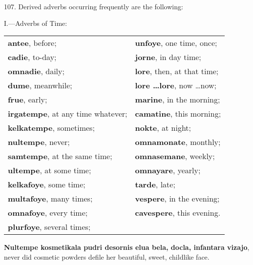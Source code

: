 107. Derived adverbs occurring frequently are the following:

\begin{center}I.—Adverbs of Time:\end{center}
\begin{tabular}{l l}
\textbf{antee}, before; & \textbf{unfoye}, one time, once; \\
\textbf{cadie}, to-day; & \textbf{jorne}, in day time; \\
\textbf{omnadie}, daily; & \textbf{lore}, then, at that time; \\
\textbf{dume}, meanwhile; & \textbf{lore \ldots  lore}, now \ldots now; \\
\textbf{frue}, early; & \textbf{marine}, in the morning; \\
\textbf{irgatempe}, at any time whatever; & \textbf{camatine}, this morning; \\
\textbf{kelkatempe}, sometimes; & \textbf{nokte}, at night; \\
\textbf{nultempe}, never; & \textbf{omnamonate}, monthly; \\
\textbf{samtempe}, at the same time; & \textbf{omnasemane}, weekly; \\
\textbf{ultempe}, at some time; & \textbf{omnayare}, yearly; \\
\textbf{kelkafoye}, some time; & \textbf{tarde}, late; \\
\textbf{multafoye}, many times; & \textbf{vespere}, in the evening; \\
\textbf{omnafoye}, every time; & \textbf{cavespere}, this evening. \\
\textbf{plurfoye}, several times; &
\end{tabular}

\textbf{Nultempe kosmetikala pudri desornis elua bela, docla, infantara vizajo}, never did cosmetic powders defile her beautiful, sweet, childlike face.

